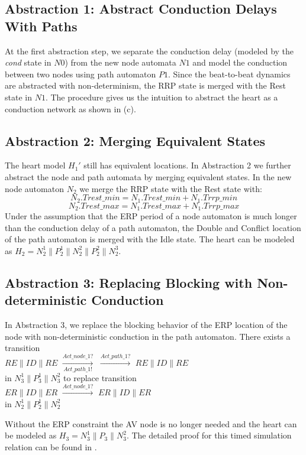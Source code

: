 \subsection{Abstraction 1: Abstract Conduction Delays With Paths}
At the first abstraction step, we separate the conduction delay (modeled by the \emph{cond} state in $N0$) from the new node automata $N1$ and model the conduction between two nodes using path automaton $P1$. Since the beat-to-beat dynamics are abstracted with non-determinism, the RRP state is merged with the Rest state in $N1$. The procedure gives us the intuition to abstract the heart as a conduction network as shown in  (c). 

\subsection{Abstraction 2: Merging Equivalent States}
The heart model $H_1'$ still has equivalent locations. In Abstraction 2 we further abstract the node and path automata by merging equivalent states. In the new node automaton $N_2$ we merge the \textsf{RRP} state with the \textsf{Rest} state with:
$$N_2.Trest\_min = N_1.Trest\_min+N_1.Trrp\_min$$
$$N_2.Trest\_max = N_1.Trest\_max+N_1.Trrp\_max$$
Under the assumption that the ERP period of a node automaton is much longer than the conduction delay of a path automaton,  the \textsf{Double} and \textsf{Conflict} location of the path automaton is merged with the \textsf{Idle} state. The heart can be modeled as $H_2=N_2^1\| P_2^1\| N_2^2\| P_2^2\| N_2^3$.

\subsection{Abstraction 3: Replacing Blocking with Non-deterministic Conduction}
In Abstraction 3, we replace the blocking behavior of the \textsf{ERP} location of the node with non-deterministic conduction in the path automaton. There exists a transition\\ 
$RE\| ID\| RE$ 
$\xrightarrow[Act\_path\_1!]{Act\_node\_1?}$ 
$\xrightarrow{Act\_path\_1?}$ 
$RE\| ID\| RE$\\
in $N_3^1\| P_3^1\| N_3^2$ to replace transition\\
$ER\| ID\| ER$ 
$\xrightarrow{Act\_node\_1?}$ 
$ER\| ID\| ER$\\
in $N_2^1\| P_2^1\| N_2^2$

Without the ERP constraint the AV node is no longer needed and the heart can be modeled as $H_3=N_3^1\| P_3\| N_3^2$.  The detailed proof for this timed simulation relation can be found in \cite{STTT13}. 
